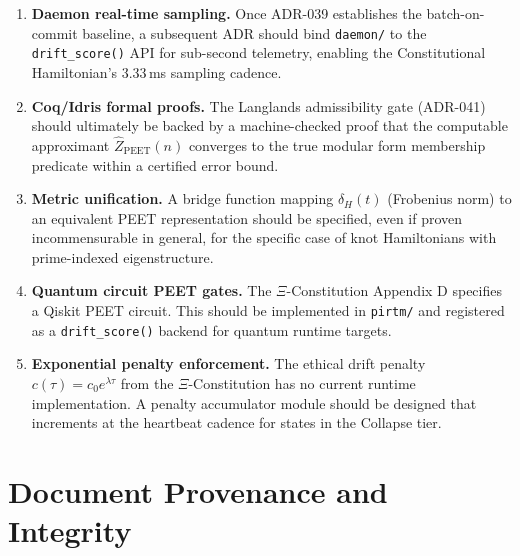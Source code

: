 \documentclass[11pt,letterpaper]{article}
\theoremstyle{definition}
\theoremstyle{remark}
\newcommand{\peet}{\mathrm{PEET}}
\newcommand{\xicons}{\(\Xi\)-Constitution}
\begin{document}
\begin{enumerate}[leftmargin=2em]
  \item \textbf{Daemon real-time sampling.} Once ADR-039 establishes
        the batch-on-commit baseline, a subsequent ADR should bind
        \texttt{daemon/} to the \texttt{drift\_score()} API for
        sub-second telemetry, enabling the Constitutional Hamiltonian's
        3.33\,ms sampling cadence.

  \item \textbf{Coq/Idris formal proofs.} The Langlands admissibility
        gate (ADR-041) should ultimately be backed by a machine-checked
        proof that the computable approximant \(\hat{Z}_{\peet}(n)\)
        converges to the true modular form membership predicate within
        a certified error bound.

  \item \textbf{Metric unification.} A bridge function mapping
        \(\delta_H(t)\) (Frobenius norm) to an equivalent PEET
        representation should be specified, even if proven
        incommensurable in general, for the specific case of
        knot Hamiltonians with prime-indexed eigenstructure.

  \item \textbf{Quantum circuit PEET gates.} The \xicons{}
        Appendix D specifies a Qiskit PEET circuit. This should
        be implemented in \texttt{pirtm/} and registered as a
        \texttt{drift\_score()} backend for quantum runtime targets.

  \item \textbf{Exponential penalty enforcement.} The ethical drift
        penalty \(c(\tau) = c_0 e^{\lambda \tau}\) from the
        \xicons{} has no current runtime implementation. A penalty
        accumulator module should be designed that increments at
        the heartbeat cadence for states in the Collapse tier.
\end{enumerate}

\section{Document Provenance and Integrity}
\end{document}
